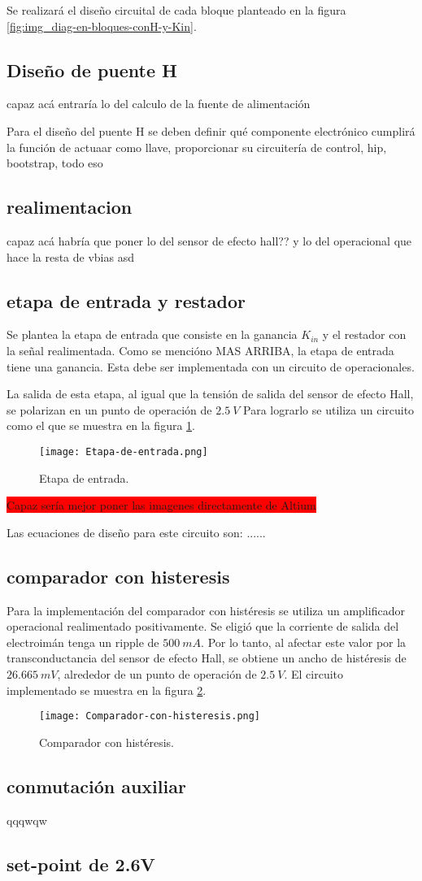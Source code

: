 Se realizará el diseño circuital de cada bloque planteado en la figura \ref{fig:img_diag-en-bloques-conH-y-Kin}.

\subsection{Diseño de puente H}
capaz acá entraría lo del calculo de la fuente de alimentación

Para el diseño del puente H se deben definir qué componente electrónico cumplirá la función de actuaar como llave, proporcionar su circuitería de control, hip, bootstrap, todo eso
\subsection{realimentacion}
capaz acá habría que poner lo del sensor de efecto hall?? y lo del operacional que hace la resta de vbias
asd
\subsection{etapa de entrada y restador}


Se plantea la etapa de entrada que consiste en la ganancia $K_{in}$ y el restador con la señal realimentada. Como se mencióno MAS ARRIBA, la etapa de entrada tiene una ganancia. Esta debe ser implementada con un circuito de operacionales.

La salida de esta etapa, al igual que la tensión de salida del sensor de efecto Hall, se polarizan en un punto de operación de $2.5\:V$ Para lograrlo se utiliza un circuito como el que se muestra en la figura \ref{fig:img_etapa-de-entrada}.


\begin{figure}[H]
	\centering
	\texttt{[image: Etapa-de-entrada.png]}
	\caption{Etapa de entrada.}
	\label{fig:img_etapa-de-entrada}
\end{figure}
\colorbox{red}{Capaz sería mejor poner las imagenes directamente de Altium}

Las ecuaciones de diseño para este circuito son: ......


\subsection{comparador con histeresis}

Para la implementación del comparador con histéresis se utiliza un amplificador operacional realimentado positivamente. Se eligió que la corriente de salida del electroimán tenga un ripple de $500\:mA$. Por lo tanto, al afectar este valor por la transconductancia del sensor de efecto Hall, se obtiene un ancho de histéresis de $26.665\:mV$, alrededor de un punto de operación de $2.5\:V$. El circuito implementado se muestra en la figura \ref{fig:img_comp-con-hist}.

\begin{figure}[H]
	\centering
	\texttt{[image: Comparador-con-histeresis.png]}
	\caption{Comparador con histéresis.}
	\label{fig:img_comp-con-hist}
\end{figure}

\subsection{conmutación auxiliar}
qqqwqw
\subsection{set-point de 2.6V}
 